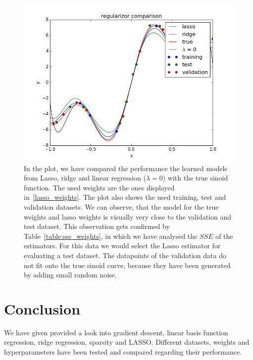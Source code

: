 \begin{figure}[!ht]
   \centering
   \includegraphics[width=0.9\linewidth]{figures/regularizor_comparison}
   \caption{In the plot, we have compared the performance the learned models from Lasso, ridge and linear regression ($\lambda = 0$) with the true sinoid function. The used weights are the ones displayed in~\cref{lasso_weights}. The plot also shows the used training, test and validation datasets. We can observe, that the model for the true weights and lasso weights is visually very close to the validation and test dataset. This observation gets confirmed by Table~\cref{table:sse_weights}, in which we have analysed the $SSE$ of the estimators. For this data we would select the Lasso estimator for evaluating a test dataset. The datapoints of the validation data do not fit onto the true sinoid curve, because they have been generated by adding small random noise.}
\label{regularizor_comparison}
\end{figure}


\section{Conclusion}
We have given provided a look into gradient descent, linear basis function regression, ridge regression, sparsity and LASSO. Different datasets, weights and hyperparameters have been tested and compared regarding their performance.